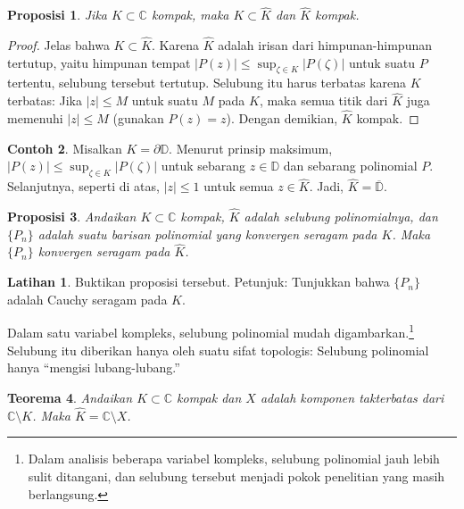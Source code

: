 \documentclass[12pt,openany]{book}
\newcommand{\sabs}[1]{\lvert {#1} \rvert}
\newcommand{\babs}[1]{\bigl\lvert {#1} \bigr\rvert}
\newcommand{\C}{{\mathbb{C}}}
\newcommand{\D}{{\mathbb{D}}}
\newcommand{\myquote}[1]{``#1''}
\theoremstyle{plain}
\newtheorem{thm}{Teorema}[section]
\newtheorem{prop}[thm]{Proposisi}
\theoremstyle{remark}
\theoremstyle{definition}
\newenvironment{exbox}{%
    \def\FrameCommand{\vrule width 1pt \relax\hspace{10pt}}%
    \MakeFramed{\advance\hsize-\width\FrameRestore}%
}{%
    \endMakeFramed
}
\theoremstyle{exercise}
\newtheorem{exercise}{Latihan}[section]
\theoremstyle{example}
\newtheorem{example}[thm]{Contoh}
\begin{document}
\begin{prop}
Jika $K \subset \C$ kompak, maka $K \subset \widehat{K}$ dan $\widehat{K}$
kompak.
\end{prop}

\begin{proof}
Jelas bahwa $K \subset \widehat{K}$.  Karena $\widehat{K}$
adalah irisan dari himpunan-himpunan tertutup, yaitu himpunan tempat
$\babs{P(z)} \leq \sup_{\zeta \in K} \babs{P(\zeta)}$ untuk suatu $P$ tertentu, selubung tersebut tertutup.
Selubung itu harus
terbatas karena $K$ terbatas:  Jika $\sabs{z} \leq M$ untuk suatu $M$ pada $K$,
maka semua titik dari $\widehat{K}$ juga memenuhi $\sabs{z} \leq M$ (gunakan $P(z)=z$).
Dengan demikian, $\widehat{K}$ kompak.
\end{proof}

\begin{example}
Misalkan $K = \partial \D$.  Menurut prinsip maksimum,
$\babs{P(z)} \leq \sup_{\zeta \in K} \babs{P(\zeta)}$ untuk sebarang $z \in \D$
dan sebarang polinomial $P$.
Selanjutnya, seperti di atas, $\sabs{z} \leq 1$ untuk semua $z \in \widehat{K}$.
Jadi, $\widehat{K} = \overline{\D}$.
\end{example}

\begin{prop} \label{prop:convergenceonKhat}
Andaikan $K \subset \C$ kompak, $\widehat{K}$ adalah selubung polinomialnya,
dan $\{ P_n \}$ adalah suatu barisan polinomial yang konvergen seragam pada
$K$.  Maka $\{ P_n \}$ konvergen seragam pada $\widehat{K}$.  
\end{prop}

\begin{exbox}
\begin{exercise}
Buktikan proposisi tersebut.  Petunjuk: Tunjukkan bahwa $\{ P_n \}$ adalah Cauchy seragam pada
$\widehat{K}$.
\end{exercise}
\end{exbox}

Dalam satu variabel kompleks, selubung polinomial mudah
digambarkan.\footnote{Dalam analisis beberapa variabel kompleks,
selubung polinomial jauh lebih sulit ditangani, dan selubung tersebut menjadi pokok
penelitian yang masih berlangsung.}
Selubung itu diberikan hanya oleh suatu sifat topologis: Selubung polinomial
hanya \myquote{mengisi lubang-lubang.}


\begin{thm}\label{thm:polyhull}
Andaikan $K \subset \C$ kompak dan $X$ adalah komponen takterbatas dari
$\C \setminus K$.  Maka $\widehat{K} = \C \setminus X$.
\end{thm}
\end{document}
